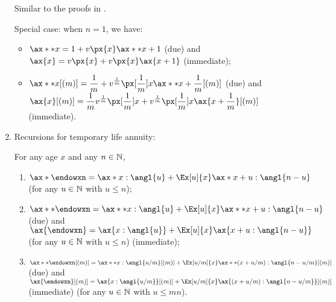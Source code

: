 \begin{enumerate}
\begin{pf}
Similar to the proofs in
.
\end{pf}

\begin{note}
Special case: when \(n=1\), we have:
\begin{itemize}
\item \(\displaystyle \ax**{x}=1+v\px{x}\ax**{x+1}\) (due) and 
\(\displaystyle \ax{x}=v\px{x}+v\px{x}\ax{x+1}\) (immediate);
\item \(\displaystyle \ax**{x}[(m)]=\frac{1}{m}+v^{\frac{1}{m}}\px[\frac{1}{m}]{x}\ax**{x+\frac{1}{m}}[(m)]\) (due)
and \(\displaystyle
\ax{x}[(m)]=\frac{1}{m}v^{\frac{1}{m}}\px[\frac{1}{m}]{x}+v^{\frac{1}{m}}\px[\frac{1}{m}]{x}\ax{x+\frac{1}{m}}[(m)]\) 
(immediate).
\end{itemize}
\end{note}

\item Recursions for temporary life annuity:
\begin{proposition}
\label{prp:tmp-annuity-recursions}
For any age \(x\) and any \(n\in\mathbb{N}\),
\begin{enumerate}
\item \(\ax*{\endowxn}=\ax*{x:\angl{u}}+\Ex[u]{x}\ax*{x+u:\angl{n-u}}\) (for any \(u\in\mathbb{N}\) with \(u\le n\));
\item \(\ax**{\endowxn}=\ax**{x:\angl{u}}+\Ex[u]{x}\ax**{x+u:\angl{n-u}}\) (due) and
\(\ax{\endowxn}=\ax{x:\angl{u}}+\Ex[u]{x}\ax{x+u:\angl{n-u}}\) (for any \(u\in\mathbb{N}\) with \(u\le n\)) (immediate);
\item \(\ax**{\endowxn}[(m)]=\ax**{x:\angl{u/m}}[(m)]+\Ex[u/m]{x}\ax**{(x+u/m):\angl{n-u/m}}[(m)]\) (due) and \\
\(\ax{\endowxn}[(m)]=\ax{x:\angl{u/m}}[(m)]+\Ex[u/m]{x}\ax{(x+u/m):\angl{n-u/m}}[(m)]\) (immediate)
(for any \(u\in\mathbb{N}\) with \(u\le mn\)).
\end{enumerate}
\end{proposition}
\begin{intuition}


\end{intuition}
\end{enumerate}
